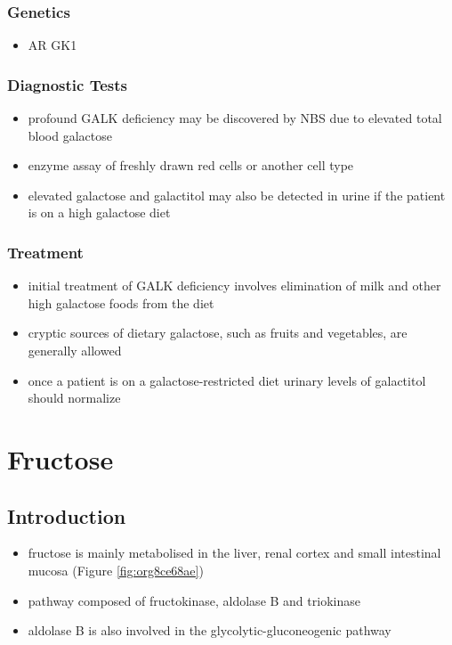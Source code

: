 \documentclass{scrartcl}
\begin{document}
\subsubsection{Genetics}
\label{sec:org1382b15}
\begin{itemize}
\item AR GK1
\end{itemize}
\subsubsection{Diagnostic Tests}
\label{sec:org6a92a2a}
\begin{itemize}
\item profound GALK deficiency may be discovered by NBS due to elevated total blood galactose
\item enzyme assay of freshly drawn red cells or another cell type
\item elevated galactose and galactitol may also be detected in urine if
the patient is on a high galactose diet
\end{itemize}

\subsubsection{Treatment}
\label{sec:orgba811e5}
\begin{itemize}
\item initial treatment of GALK deficiency involves elimination of milk
and other high galactose foods from the diet
\item cryptic sources of dietary galactose, such as fruits and vegetables,
are generally allowed
\item once a patient is on a galactose-restricted diet urinary levels of
galactitol should normalize
\end{itemize}
\section{Fructose}
\label{sec:orgc106786}
\subsection{Introduction}
\label{sec:org19d02f4}
\begin{itemize}
\item fructose is mainly metabolised in the liver, renal cortex and small
intestinal mucosa (Figure \ref{fig:org8ce68ae})
\item pathway composed of fructokinase, aldolase B and triokinase
\item aldolase B is also involved in the glycolytic-gluconeogenic pathway
\end{itemize}
\end{document}
